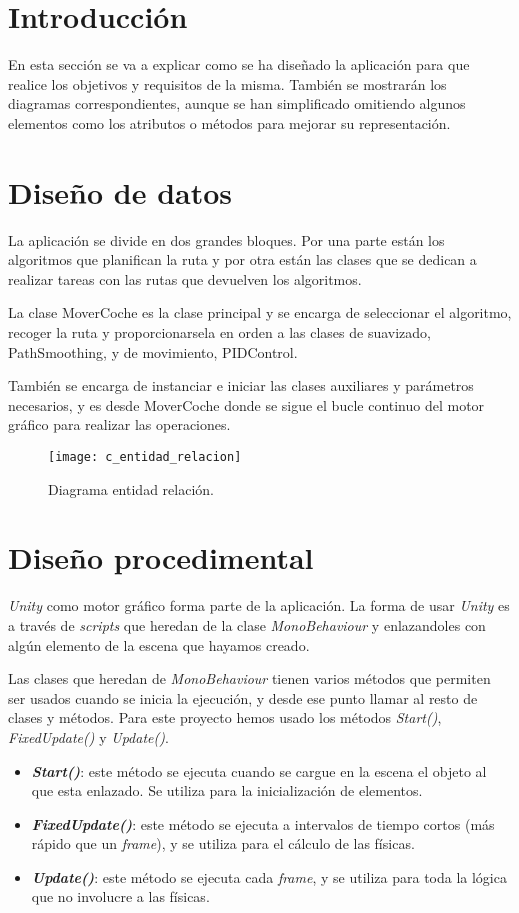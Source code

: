 
\section{Introducción}
En esta sección se va a explicar como se ha diseñado la aplicación para que realice los objetivos y requisitos de la misma. También se mostrarán los diagramas correspondientes, aunque se han simplificado omitiendo algunos elementos como los atributos o métodos para mejorar su representación.

\section{Diseño de datos}
La aplicación se divide en dos grandes bloques. Por una parte están los algoritmos que planifican la ruta y por otra están las clases que se dedican a realizar tareas con las rutas que devuelven los algoritmos.

La clase MoverCoche es la clase principal y se encarga de seleccionar el algoritmo, recoger la ruta y proporcionarsela en orden a las clases de suavizado, PathSmoothing, y de movimiento, PIDControl.

También se encarga de instanciar e iniciar las clases auxiliares y parámetros necesarios, y es desde MoverCoche donde se sigue el bucle continuo del motor gráfico para realizar las operaciones.

\begin{figure}[htpb]
    \centering
    \texttt{[image: c\_entidad\_relacion]}
    \caption[Diagrama entidad relación]{Diagrama entidad relación.}
    \label{fig:centidadrelacion}
\end{figure}

\section{Diseño procedimental}
\textit{Unity} como motor gráfico forma parte de la aplicación. La forma de usar \textit{Unity} es a través de \textit{scripts} que heredan de la clase \textit{MonoBehaviour} y enlazandoles con algún elemento de la escena que hayamos creado.

Las clases que heredan de \textit{MonoBehaviour} tienen varios métodos que permiten ser usados cuando se inicia la ejecución, y desde ese punto llamar al resto de clases y métodos. Para este proyecto hemos usado los métodos \textit{Start()}, \textit{FixedUpdate()} y \textit{Update()}.
\begin{itemize}
\item \textbf{\textit{Start()}}: este método se ejecuta cuando se cargue en la escena el objeto al que esta enlazado. Se utiliza para la inicialización de elementos.
\item \textbf{\textit{FixedUpdate()}}: este método se ejecuta a intervalos de tiempo cortos (más rápido que un \textit{frame}), y se utiliza para el cálculo de las físicas.
\item \textbf{\textit{Update()}}: este método se ejecuta cada \textit{frame}, y se utiliza para toda la lógica que no involucre a las físicas.
\end{itemize}

